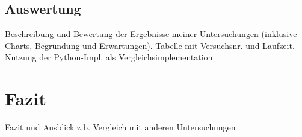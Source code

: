 \section{Auswertung}
Beschreibung und Bewertung der Ergebnisse meiner Untersuchungen (inklusive Charts, Begründung und Erwartungen). Tabelle mit Versuchsnr. und  Laufzeit. Nutzung der Python-Impl. als Vergleichsimplementation

\chapter{Fazit}
Fazit und Ausblick
z.b. Vergleich mit anderen Untersuchungen

